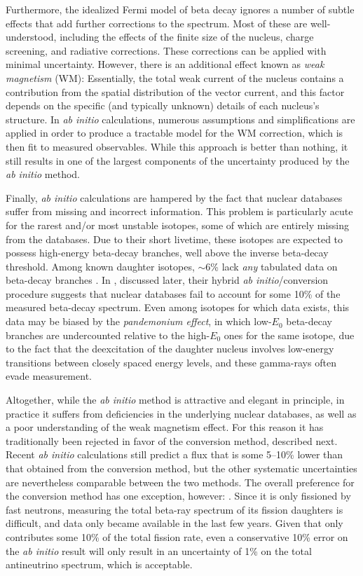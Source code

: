 \documentclass[../thesis.tex]{subfiles}
\begin{document}
Furthermore, the idealized Fermi model of beta decay ignores a number of subtle effects that add further corrections to the spectrum. Most of these are well-understood, including the effects of the finite size of the nucleus, charge screening, and radiative corrections. These corrections can be applied with minimal uncertainty. However, there is an additional effect known as \emph{weak magnetism} (WM): Essentially, the total weak current of the nucleus contains a contribution from the spatial distribution of the vector current, and this factor depends on the specific (and typically unknown) details of each nucleus's structure. In \emph{ab initio} calculations, numerous assumptions and simplifications are applied in order to produce a tractable model for the WM correction, which is then fit to measured observables. While this approach is better than nothing, it still results in one of the largest components of the uncertainty produced by the \emph{ab initio} method.

Finally, \emph{ab initio} calculations are hampered by the fact that nuclear databases suffer from missing and incorrect information. This problem is particularly acute for the rarest and/or most unstable isotopes, some of which are entirely missing from the databases. Due to their short livetime, these isotopes are expected to possess high-energy beta-decay branches, well above the inverse beta-decay threshold. Among known daughter isotopes, $\sim$6\% lack \emph{any} tabulated data on beta-decay branches \cite{DwyerLangford}. In \cite{PhysRevC.83.054615}, discussed later, their hybrid \emph{ab initio}/conversion procedure suggests that nuclear databases fail to account for some 10\% of the measured beta-decay spectrum. Even among isotopes for which data exists, this data may be biased by the \emph{pandemonium effect}, in which low-$E_0$ beta-decay branches are undercounted relative to the high-$E_0$ ones for the same isotope, due to the fact that the deexcitation of the daughter nucleus involves low-energy transitions between closely spaced energy levels, and these gamma-rays often evade measurement.

Altogether, while the \emph{ab initio} method is attractive and elegant in principle, in practice it suffers from deficiencies in the underlying nuclear databases, as well as a poor understanding of the weak magnetism effect. For this reason it has traditionally been rejected in favor of the conversion method, described next. Recent \emph{ab initio} calculations still predict a flux that is some 5--10\% lower than that obtained from the conversion method, but the other systematic uncertainties are nevertheless comparable between the two methods. The overall preference for the conversion method has one exception, however: \ureight. Since it is only fissioned by fast neutrons, measuring the total beta-ray spectrum of its fission daughters is difficult, and data only became available in the last few years. Given that \ureight only contributes some 10\% of the total fission rate, even a conservative 10\% error on the \emph{ab initio} result will only result in an uncertainty of 1\% on the total antineutrino spectrum, which is acceptable.
\end{document}
